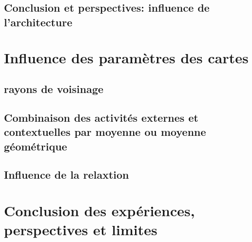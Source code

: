 \subsection{Conclusion et perspectives: influence de l'architecture}


\section{Influence des paramètres des cartes}

\subsection{rayons de voisinage}

\subsection{Combinaison des activités externes et contextuelles par moyenne ou moyenne géométrique}

\subsection{Influence de la relaxtion}

\section{Conclusion des expériences, perspectives et limites}